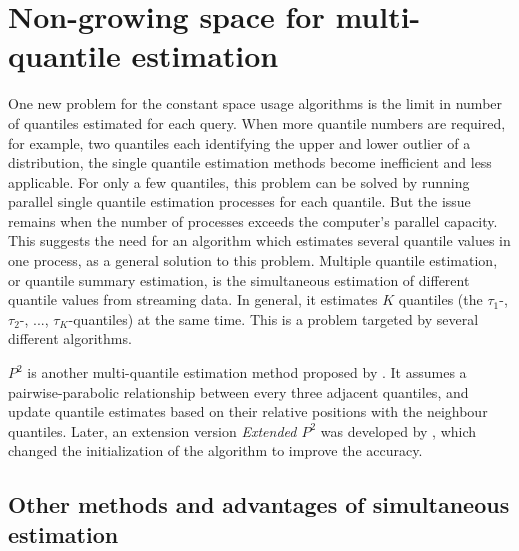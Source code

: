 
\section{Non-growing space for multi-quantile estimation}
\label{multiquantile}
One new problem for the constant space usage algorithms is the limit in number of quantiles estimated for each query.
When more quantile numbers are required, for example, two quantiles each identifying the upper and lower outlier of a distribution, the single quantile estimation methods become inefficient and less applicable.
For only a few quantiles, this problem can be solved by running parallel single quantile estimation processes for each quantile. But the issue remains when the number of processes exceeds the computer's parallel capacity.
This suggests the need for an algorithm which estimates several quantile values in one process, as a general solution to this problem.
Multiple quantile estimation, or quantile summary estimation, is the simultaneous estimation of different quantile values from streaming data.
In general, it estimates $K$ quantiles (the $\tau_1$-, $\tau_2$-, $...$, $\tau_K$-quantiles) at the same time.
This is a problem targeted by several different algorithms.


\textit{$P^2$} is another multi-quantile estimation method proposed by \citeauthor{jainP2AlgorithmDynamic1985}\cite{jainP2AlgorithmDynamic1985}. It assumes a pairwise-parabolic relationship between every three adjacent quantiles, and update quantile estimates based on their relative positions with the neighbour quantiles. Later, an extension version \textit{Extended $P^2$} was developed by \citeauthor{raatikainenSequentialProcedureSimultaneous1993}\cite{raatikainenSequentialProcedureSimultaneous1993}, which changed the initialization of the algorithm to improve the accuracy.


\subsection{Other methods and advantages of simultaneous estimation}

